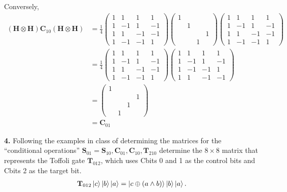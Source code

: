 \documentclass{book}
\theoremstyle{definition}
\newcommand{\nn}{\nonumber}
\newcommand{\f}[2]{\frac{#1}{#2}}
\newcommand{\had}{\mathbf{H}}
\begin{document}
Conversely,
\begin{align}
(\had \otimes \had) \mathbf{C}_{10} (\had \otimes \had) &=  \f{1}{4}\begin{pmatrix}
1&1&1&1\\
1&-1&1&-1\\
1&1&-1&-1\\
1&-1&-1&1
\end{pmatrix}\begin{pmatrix}
1 &&&\\&1&&\\&&&1\\&&1&
\end{pmatrix}\begin{pmatrix}
1&1&1&1\\
1&-1&1&-1\\
1&1&-1&-1\\
1&-1&-1&1
\end{pmatrix}\nn\\
&= \f{1}{4}\begin{pmatrix}
1&1&1&1\\
1&-1&1&-1\\
1&1&-1&-1\\
1&-1&-1&1
\end{pmatrix}\begin{pmatrix}
1& 1& 1& 1\\
1& -1& 1& -1\\
1& -1& -1& 1\\
1& 1& -1& -1
\end{pmatrix}\nn\\
&= \begin{pmatrix}
1&&&\\&&&1\\&&1&\\&1&&
\end{pmatrix} \nn\\
&= \mathbf{C}_{01}
\end{align}



\newpage



\noindent \textbf{4.} Following the examples in class of determining the matrices for the ``conditional operations'' $\mathbf{S}_{01} = \mathbf{S}_{10}, \mathbf{C}_{01}, \mathbf{C}_{10}, \mathbf{T}_{210}$ determine the $8\times 8$ matrix that represents the Toffoli gate $\mathbf{T}_{012}$, which uses Cbits 0 and 1 as the control bits and Cbits 2 as the target bit. 
\begin{align}
\mathbf{T}_{012}\ket{c}\ket{b}\ket{a} = \ket{c\oplus (a\land b)}\ket{b}\ket{a}.
\end{align}
\end{document}
